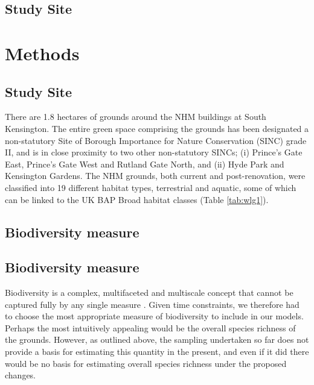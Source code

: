\subsection{Study Site}%
\else
\section*{Methods}
\subsection*{Study Site}
\fi

There are 1.8 hectares of grounds around the NHM buildings at South Kensington. The entire green space comprising the grounds has been designated a non-statutory Site of Borough Importance for Nature Conservation (SINC) grade II, and is in close proximity to two other non-statutory SINCs; (i) Prince's Gate East, Prince's Gate West and Rutland Gate North, and (ii) Hyde Park and Kensington Gardens. The NHM grounds, both current and post-renovation, were classified into 19 different habitat types, terrestrial and aquatic, some of which can be linked to the UK BAP Broad habitat classes (Table \ref{tab:wlg1}).

\ifappendixStyle %
\subsection{Biodiversity measure}%
\else
\subsection*{Biodiversity measure}
\fi

Biodiversity is a complex, multifaceted and multiscale concept that cannot be captured fully by any single measure \citep{Purvis:2000nat}. Given time constraints, we therefore had to choose the most appropriate measure of biodiversity to include in our models. Perhaps the most intuitively appealing would be the overall species richness of the grounds. However, as outlined above, the sampling undertaken so far does not provide a basis for estimating this quantity in the present, and even if it did there would be no basis for estimating overall species richness under the proposed changes.

